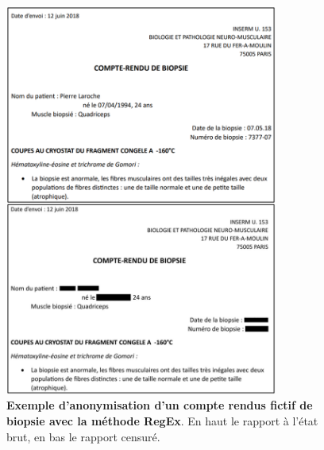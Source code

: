 \begin{figure}[!ht]
 \centering
 \includegraphics[width=0.8\textwidth]{figures/regex.png}
 \caption[Exemple anonymisation RegEx]{\textbf{Exemple d'anonymisation d'un compte rendus fictif de biopsie avec la méthode RegEx}. En haut le rapport à l'état brut, en bas le rapport censuré.}
 \label{fig:regex}
\end{figure}

